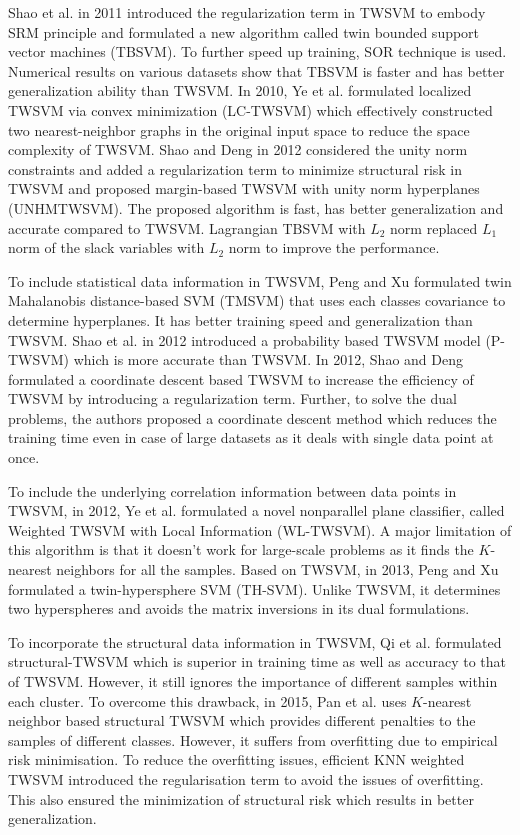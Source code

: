 \documentclass[pdflatex,sn-mathphys]{sn-jnl}%
\theoremstyle{thmstyleone}%
\theoremstyle{thmstyletwo}%
\theoremstyle{thmstylethree}%
\begin{document}
Shao et al. \cite{shao2011improvements} in 2011  introduced the regularization term in TWSVM to embody SRM principle and formulated a new algorithm called twin bounded support vector machines (TBSVM). To further speed up training, SOR technique is used. Numerical results on various datasets show that TBSVM is faster and has better generalization ability than TWSVM. In 2010, Ye et al. \cite{ye2011localized} formulated localized TWSVM via convex minimization (LC-TWSVM) which effectively constructed two nearest-neighbor graphs in the original input space to reduce the space complexity of TWSVM. Shao and Deng \cite{shao2013novel} in 2012 considered the unity norm constraints and added a regularization term to minimize structural risk in TWSVM and proposed margin-based TWSVM with unity norm hyperplanes (UNHMTWSVM). The proposed algorithm is fast, has better generalization and accurate  compared to TWSVM. Lagrangian TBSVM with $L_2$ norm \cite{gupta2019lagrangian} replaced $L_1$ norm of the slack variables with $L_2$ norm to improve the performance.

To include statistical data information in TWSVM, Peng and Xu \cite{peng2012twin} formulated twin Mahalanobis distance-based SVM (TMSVM) that uses each classes covariance to determine hyperplanes. It has better training speed and generalization than TWSVM. Shao et al. \cite{shao2012probabilistic}  in 2012 introduced a probability based TWSVM model (P-TWSVM) which  is more accurate than TWSVM. In 2012, Shao and Deng \cite{shao2012coordinate} formulated a coordinate descent based TWSVM to increase the efficiency of TWSVM by introducing a regularization term. Further, to solve the dual problems, the authors proposed a coordinate descent method which reduces the training time even in case of large datasets as it deals with single data point at once.

To include the underlying correlation information between data points in TWSVM, in 2012, Ye et al. \cite{ye2012weighted} formulated a novel nonparallel plane classifier, called Weighted TWSVM with Local Information (WL-TWSVM). A major limitation of this algorithm is that it doesn't work for large-scale problems as it  finds the $K$-nearest neighbors for all the samples. Based on TWSVM, in 2013, Peng and Xu \cite{peng2013twin} formulated a twin-hypersphere SVM (TH-SVM). Unlike TWSVM, it determines two hyperspheres and avoids the matrix inversions in its dual formulations.

To incorporate the structural data information in TWSVM, Qi et al. \cite{qi2013structural} formulated structural-TWSVM which is superior in training time as well as accuracy to that of TWSVM. However, it still ignores the importance of different samples within each cluster. To overcome this drawback, in 2015, Pan et al. \cite{pan2015k} uses $K$-nearest neighbor based structural TWSVM which provides different penalties to the samples of different classes. However, it suffers from overfitting due to empirical risk minimisation. To reduce the overfitting issues, efficient KNN weighted TWSVM \cite{xie2019efficient} introduced the regularisation term to avoid the issues of overfitting. This also ensured the minimization of structural risk which results in better generalization. 
\end{document}
